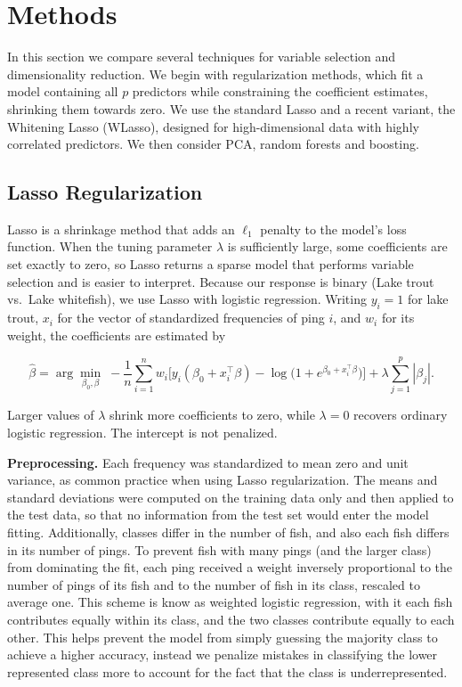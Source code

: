 \documentclass[
  letterpaper,
  DIV=11,
  numbers=noendperiod]{scrartcl}
\begin{document}
\hypertarget{methods}{%
\section{Methods}\label{methods}}

In this section we compare several techniques for variable selection and
dimensionality reduction. We begin with regularization methods, which
fit a model containing all \(p\) predictors while constraining the
coefficient estimates, shrinking them towards zero. We use the standard
Lasso and a recent variant, the Whitening Lasso (WLasso), designed for
high-dimensional data with highly correlated predictors. We then
consider PCA, random forests and boosting.

\hypertarget{lasso-regularization}{%
\subsection{Lasso Regularization}\label{lasso-regularization}}

Lasso is a shrinkage method that adds an \(\ell_1\) penalty to the
model's loss function. When the tuning parameter \(\lambda\) is
sufficiently large, some coefficients are set exactly to zero, so Lasso
returns a sparse model that performs variable selection and is easier to
interpret. Because our response is binary (Lake trout vs.~Lake
whitefish), we use Lasso with logistic regression. Writing \(y_i = 1\)
for lake trout, \(x_i\) for the vector of standardized frequencies of
ping \(i\), and \(w_i\) for its weight, the coefficients are estimated
by

\[
\hat{\beta} = \arg\min_{\beta_0,\beta}\; -\frac{1}{n}\sum_{i=1}^{n} w_i\Big[y_i(\beta_0 + x_i^\top\beta) - \log\big(1 + e^{\beta_0 + x_i^\top\beta}\big)\Big] + \lambda \sum_{j=1}^{p}|\beta_j| .
\]

Larger values of \(\lambda\) shrink more coefficients to zero, while
\(\lambda = 0\) recovers ordinary logistic regression. The intercept is
not penalized.

\textbf{Preprocessing.} Each frequency was standardized to mean zero and
unit variance, as common practice when using Lasso regularization. The
means and standard deviations were computed on the training data only
and then applied to the test data, so that no information from the test
set would enter the model fitting. Additionally, classes differ in the
number of fish, and also each fish differs in its number of pings. To
prevent fish with many pings (and the larger class) from dominating the
fit, each ping received a weight inversely proportional to the number of
pings of its fish and to the number of fish in its class, rescaled to
average one. This scheme is know as weighted logistic regression, with
it each fish contributes equally within its class, and the two classes
contribute equally to each other. This helps prevent the model from
simply guessing the majority class to achieve a higher accuracy, instead
we penalize mistakes in classifying the lower represented class more to
account for the fact that the class is underrepresented.
\end{document}
